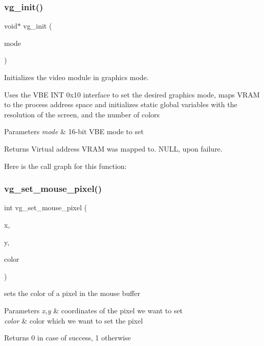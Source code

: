 \subsubsection{\texorpdfstring{vg\+\_\+init()}{vg\_init()}}
{\footnotesize\ttfamily void$\ast$ vg\+\_\+init (\begin{DoxyParamCaption}\item[{unsigned short}]{mode }\end{DoxyParamCaption})}



Initializes the video module in graphics mode. 

Uses the V\+BE I\+NT 0x10 interface to set the desired graphics mode, maps V\+R\+AM to the process\textquotesingle{} address space and initializes static global variables with the resolution of the screen, and the number of colors


\begin{DoxyParams}{Parameters}
{\em mode} & 16-\/bit V\+BE mode to set \\
\hline
\end{DoxyParams}
\begin{DoxyReturn}{Returns}
Virtual address V\+R\+AM was mapped to. N\+U\+LL, upon failure. 
\end{DoxyReturn}
Here is the call graph for this function\+:
\hypertarget{group__video__gr_ga78765c3e4634b79d0c27b464be410803}{}\label{group__video__gr_ga78765c3e4634b79d0c27b464be410803} 
\subsubsection{\texorpdfstring{vg\+\_\+set\+\_\+mouse\+\_\+pixel()}{vg\_set\_mouse\_pixel()}}
{\footnotesize\ttfamily int vg\+\_\+set\+\_\+mouse\+\_\+pixel (\begin{DoxyParamCaption}\item[{int}]{x,  }\item[{int}]{y,  }\item[{unsigned int}]{color }\end{DoxyParamCaption})}



sets the color of a pixel in the mouse buffer 


\begin{DoxyParams}{Parameters}
{\em x,y} & coordinates of the pixel we want to set \\
\hline
{\em color} & color which we want to set the pixel \\
\hline
\end{DoxyParams}
\begin{DoxyReturn}{Returns}
0 in case of success, 1 otherwise 
\end{DoxyReturn}
\hypertarget{group__video__gr_ga729c07175ab64956c7fd9944d7676888}{}\label{group__video__gr_ga729c07175ab64956c7fd9944d7676888} 
